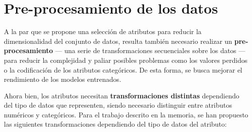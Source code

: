 \section{Pre-procesamiento de los datos}

A la par que se propone una selección de atributos para reducir la dimensionalidad del conjunto de datos, resulta también necesario realizar un \textbf{pre-procesamiento} --- una serie de transformaciones secuenciales sobre los datos --- para reducir la complejidad y paliar posibles problemas como los valores perdidos o la codificación de los atributos categóricos. De esta forma, se busca mejorar el rendimiento de los modelos entrenados.

Ahora bien, los atributos necesitan \textbf{transformaciones distintas} dependiendo del tipo de datos que representen, siendo necesario distinguir entre atributos numéricos y categóricos. Para el trabajo descrito en la memoria, se han propuesto las siguientes transformaciones dependiendo del tipo de datos del atributo:

